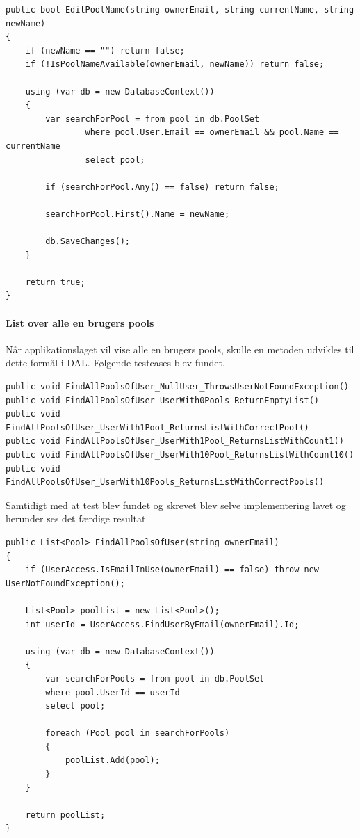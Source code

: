 \begin{lstlisting}[caption=Metoden EditPoolName]
public bool EditPoolName(string ownerEmail, string currentName, string newName)
{
	if (newName == "") return false;
	if (!IsPoolNameAvailable(ownerEmail, newName)) return false;
	
	using (var db = new DatabaseContext())
	{
		var searchForPool = from pool in db.PoolSet
				where pool.User.Email == ownerEmail && pool.Name == currentName
				select pool;
		
		if (searchForPool.Any() == false) return false;
		
		searchForPool.First().Name = newName;
		
		db.SaveChanges();
	}
	
	return true;
}
\end{lstlisting}

\paragraph{List over alle en brugers pools}

Når applikationslaget vil vise alle en brugers pools, skulle en metoden udvikles til dette formål i DAL. Følgende testcases blev fundet.

\begin{lstlisting}[caption=Testcases til FindAllPoolsOfUser metoden]
public void FindAllPoolsOfUser_NullUser_ThrowsUserNotFoundException()
public void FindAllPoolsOfUser_UserWith0Pools_ReturnEmptyList()
public void FindAllPoolsOfUser_UserWith1Pool_ReturnsListWithCorrectPool()
public void FindAllPoolsOfUser_UserWith1Pool_ReturnsListWithCount1()
public void FindAllPoolsOfUser_UserWith10Pool_ReturnsListWithCount10()
public void FindAllPoolsOfUser_UserWith10Pools_ReturnsListWithCorrectPools()
\end{lstlisting}

Samtidigt med at test blev fundet og skrevet blev selve implementering lavet og herunder ses det færdige resultat.

\begin{lstlisting}[caption=Metoden FindAllPoolsOfUser]
public List<Pool> FindAllPoolsOfUser(string ownerEmail)
{
	if (UserAccess.IsEmailInUse(ownerEmail) == false) throw new UserNotFoundException();
	
	List<Pool> poolList = new List<Pool>();
	int userId = UserAccess.FindUserByEmail(ownerEmail).Id;
	
	using (var db = new DatabaseContext())
	{
		var searchForPools = from pool in db.PoolSet
		where pool.UserId == userId
		select pool;
		
		foreach (Pool pool in searchForPools)
		{
			poolList.Add(pool);
		}
	}
	
	return poolList;
}
\end{lstlisting}

